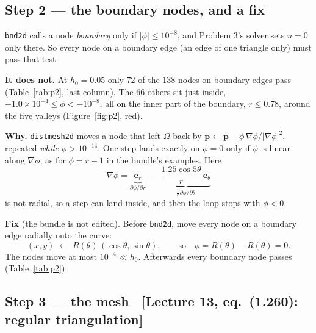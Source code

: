 \documentclass[11pt]{article}
\newcommand{\abs}[1]{\lvert #1\rvert}
\newcommand{\Om}{\Omega}
\newcommand{\grad}{\nabla}
\newcommand{\src}[1]{{\small\color{black!55}\textsf{[#1]}}}
\begin{document}
\subsection*{Step 2 --- the boundary nodes, and a fix}

\begin{steps}
\item \texttt{bnd2d} calls a node \emph{boundary} only if
      $\abs{\phi}\le10^{-8}$, and Problem 3's solver sets $u=0$ only there.
      So every node on a boundary edge (an edge of one triangle only) must
      pass that test.
\item \textbf{It does not.}  At $h_0=0.05$ only $72$ of the $138$ nodes on
      boundary edges pass (Table~\ref{tab:p2}, last column).  The $66$ others
      sit just inside, $-1.0\times10^{-4}\le\phi<-10^{-8}$, all on the inner
      part of the boundary, $r\le0.78$, around the five valleys
      (Figure~\ref{fig:p2}, red).
\item \textbf{Why.}  \texttt{distmesh2d} moves a node that left $\Om$ back by
      $\bm p\leftarrow\bm p-\phi\,\grad\phi/\abs{\grad\phi}^{2}$, repeated
      \emph{while $\phi>10^{-14}$}.  One step lands exactly on $\phi=0$ only if
      $\phi$ is linear along $\grad\phi$, as for $\phi=r-1$ in the bundle's
      examples.  Here
\begin{equation}\label{eq:gradphi}
  \grad\phi=\underbrace{\bm e_{r}}_{\partial\phi/\partial r}
           \;-\;\underbrace{\frac{1.25\cos5\theta}{r}\,\bm e_{\theta}}_{\frac1r\partial\phi/\partial\theta}
\end{equation}
      is not radial, so a step can land inside, and then the loop stops with
      $\phi<0$.
\item \textbf{Fix} (the bundle is not edited).  Before \texttt{bnd2d}, move
      every node on a boundary edge radially onto the curve:
\begin{equation}\label{eq:snap}
  (x,y)\;\leftarrow\;R(\theta)\,(\cos\theta,\sin\theta),
  \qquad\text{so}\quad \phi=R(\theta)-R(\theta)=0 .
\end{equation}
      The nodes move at most $10^{-4}\ll h_{0}$.  Afterwards every boundary
      node passes (Table~\ref{tab:p2}).
\end{steps}

\subsection*{Step 3 --- the mesh
  \ \src{Lecture 13, eq.~(1.260): regular triangulation}}
\end{document}
